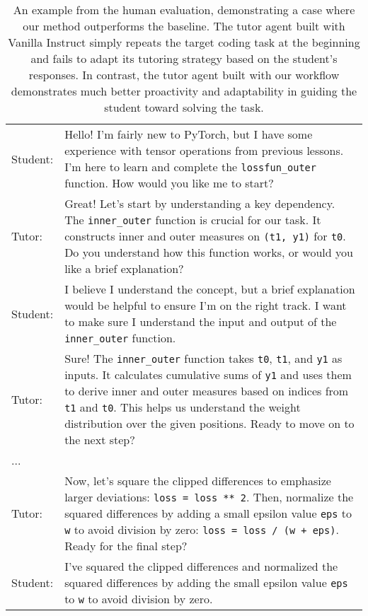\begin{table*}[th]
{\begin{tabular}{lp{16.5cm}}
Student:  &  Hello! I'm fairly new to PyTorch, but I have some experience with tensor operations from previous lessons. I'm here to learn and complete the \texttt{lossfun\_outer} function. How would you like me to start?  \\

Tutor: &  Great! Let's start by understanding a key dependency. The \texttt{inner\_outer} function is crucial for our task. It constructs inner and outer measures on \texttt{(t1, y1)} for \texttt{t0}. Do you understand how this function works, or would you like a brief explanation?  \\

Student:  & I believe I understand the concept, but a brief explanation would be helpful to ensure I'm on the right track. I want to make sure I understand the input and output of the \texttt{inner\_outer} function.  \\

Tutor: &  Sure! The \texttt{inner\_outer} function takes \texttt{t0}, \texttt{t1}, and \texttt{y1} as inputs. It calculates cumulative sums of \texttt{y1} and uses them to derive inner and outer measures based on indices from \texttt{t1} and \texttt{t0}. This helps us understand the weight distribution over the given positions. Ready to move on to the next step?  \\
... &  \\

Tutor:  &  Now, let's square the clipped differences to emphasize larger deviations: \texttt{loss = loss ** 2}. Then, normalize the squared differences by adding a small epsilon value \texttt{eps} to \texttt{w} to avoid division by zero: \texttt{loss = loss / (w + eps)}. Ready for the final step?   \\

Student: &  I've squared the clipped differences and normalized the squared differences by adding the small epsilon value \texttt{eps} to \texttt{w} to avoid division by zero. \\

\bottomrule
\end{tabular}}
\caption{An example from the human evaluation, demonstrating a case where our method outperforms the baseline. The tutor agent built with Vanilla Instruct simply repeats the target coding task at the beginning and fails to adapt its tutoring strategy based on the student’s responses. In contrast, the tutor agent built with our \model workflow demonstrates much better proactivity and adaptability in guiding the student toward solving the task. }
\label{tab:case_win}
\end{table*}





